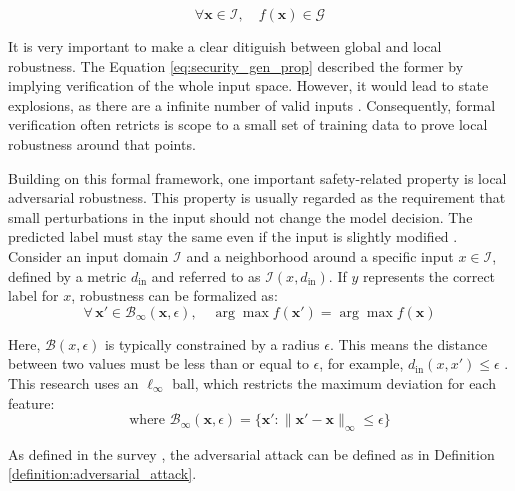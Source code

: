 \begin{equation}\label{eq:security_gen_prop}
 \forall \mathbf{x} \in \mathcal{I}, \quad f(\mathbf{x}) \in \mathcal{G}
 \end{equation}


It is very important to make a clear ditiguish between global and local robustness. The Equation \ref{eq:security_gen_prop} described the former by implying verification of the whole input space. However, it would lead to state explosions, as there are a infinite number of valid inputs \cite{huangSafetyVerificationDeep2017}. Consequently, formal verification often retricts is scope to a small set of training data to prove local robustness around that points. 

Building on this formal framework, one important safety-related property is local adversarial robustness. This property is usually regarded as the requirement that small perturbations in the input should not change the model decision. The predicted label must stay the same even if the input is slightly modified \cite{huangSurveySafetyTrustworthiness2020, linIntegerarithmeticonlyCertifiedRobustness2021}. Consider an input domain $\mathcal{I}$ and a neighborhood around a specific input $x \in \mathcal{I}$, defined by a metric $d_{\text{in}}$ and referred to as $\mathcal{I}(x,d_{\text{in}})$. If $y$ represents the correct label for $x$, robustness can be formalized as:
\begin{equation}\label{eq:local_robustness}
 \forall \, \mathbf{x}' \in \mathcal{B}_\infty(\mathbf{x}, \epsilon), \quad \arg\max f(\mathbf{x}') = \arg\max f(\mathbf{x}) 
\end{equation}


Here, $\mathcal{B}(x,\epsilon)$ is typically constrained by a radius $\epsilon$. This means the distance between two values must be less than or equal to $\epsilon$, for example, $d_{\text{in}}(x,x') \le \epsilon$ \cite{huangSurveySafetyTrustworthiness2020}. This research uses an $\ell_\infty$ ball, which restricts the maximum deviation for each feature:
\[
 \text{where } \mathcal{B}_{\infty}(\mathbf{x}, \epsilon) = \{\mathbf{x}' : \|\mathbf{x}' - \mathbf{x}\|_\infty \leq \epsilon\}
\] 

As defined in the survey \cite{huangSurveySafetyTrustworthiness2020}, the adversarial attack can be defined as in Definition \ref{definition:adversarial_attack}.

